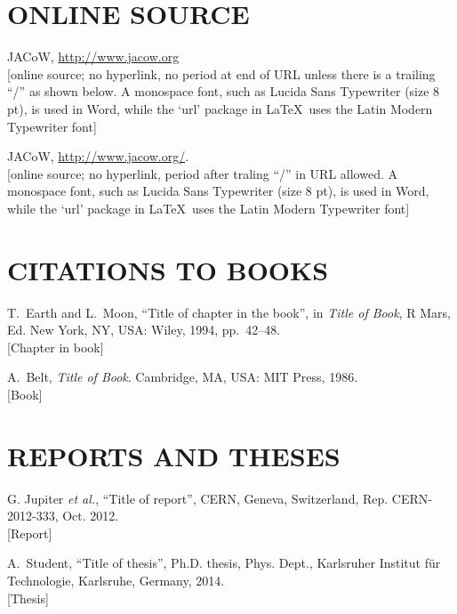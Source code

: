 \documentclass[a4paper,
              ]{jacow}
\begin{document}
\section{ONLINE SOURCE}

\begin{thebibliography}{99} %
  \setcounter{enumi}{11}
		JACoW, \url{http://www.jacow.org} \\
		\textcolor{jvio}{[online source; no hyperlink, no period at end of URL
						  unless there is a trailing “/” as shown below. A monospace
						  font, such as Lucida Sans Typewriter (size 8 pt), is used in
					      Word, while the ‘url’ package in \LaTeX\ uses the Latin Modern Typewriter font]}

  \setcounter{enumi}{11}
		JACoW, \url{http://www.jacow.org/}.  \\
	\textcolor{jvio}{[online source; no hyperlink, period after traling “/” in
					 URL allowed. A monospace font, such as Lucida Sans Typewriter 
					 (size 8 pt), is used in Word, while the ‘url’ package in \LaTeX\  
					 uses the Latin Modern Typewriter font]}
\end{thebibliography}

\section{CITATIONS TO BOOKS}

\begin{thebibliography}{99} %
	\setcounter{enumi}{12}
		T.~Earth and L.~Moon, 
		“Title of chapter in the book”, 
		in \emph{Title of Book}, R Mars, Ed. New York, NY, USA: 
		Wiley, 1994, pp.~42--48. \\
	\textcolor{jbook}{[Chapter in book]}
	
		A.~Belt, \emph{Title of Book}. Cambridge, MA, USA: 
		MIT Press, 1986. \\
	\textcolor{jbook}{[Book]}
\end{thebibliography}

\section{REPORTS AND THESES}

\begin{thebibliography}{99} %
	\setcounter{enumi}{14}
		G. Jupiter \emph{et al.}, 
		“Title of report”, CERN, Geneva, Switzerland,
		Rep. CERN-2012-333, Oct. 2012.\\
	\textcolor{jrept}{[Report]}

		A.~Student, “Title of thesis”, 
		Ph.D. thesis, Phys. Dept.,
		Karlsruher Institut für Technologie, Karlsruhe, 
		Germany, 2014.\\
	\textcolor{jrept}{[Thesis]}
\end{thebibliography}
\end{document}
